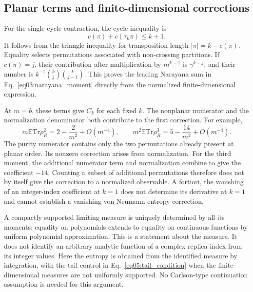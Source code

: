 \documentclass[11pt,letterpaper]{article}
\theoremstyle{plain}
\theoremstyle{definition}
\theoremstyle{remark}
\begin{document}
\subsection{Planar terms and finite-dimensional corrections}
\label{subsec12:result_free_poisson}
\label{subsec12:result_catalan_failure}

For the single-cycle contraction, the cycle inequality is
\begin{equation}
\label{eq12:cycle_bound}
 c(\pi)+c(\tau_k\pi)\leq k+1.
\end{equation}
It follows from the triangle inequality for transposition length
$|\pi|=k-c(\pi)$.  Equality selects permutations associated with
non-crossing partitions.  If $c(\pi)=j$, their contribution after
multiplication by $m^{k-1}$ is $\gamma^{k-j}$, and their number is
$k^{-1}\binom{k}{j}\binom{k}{j-1}$.  This proves the leading
Narayana sum in Eq.~\eqref{eq03:narayana_moment} directly from the
normalized finite-dimensional expression.

At $m=b$, these terms give $C_k$ for each fixed $k$.  The nonplanar
numerator and the normalization denominator both contribute to the
first correction.  For example,
\begin{equation}
\label{eq12:finite_corrections}
 m\mathbb E\mathrm{Tr}\rho_R^2
 =2-\frac{2}{m^2}+O(m^{-4}),
 \qquad
 m^2\mathbb E\mathrm{Tr}\rho_R^3
 =5-\frac{14}{m^2}+O(m^{-4}).
\end{equation}
The purity numerator contains only the two permutations already present
at planar order.  Its nonzero correction arises from normalization.
For the third moment, the additional numerator term and normalization
combine to give the coefficient $-14$.  Counting a subset of additional
permutations therefore does not by itself give the correction to a
normalized observable.  A fortiori, the vanishing of an integer-index
coefficient at $k=1$ does not determine its derivative at $k=1$ and
cannot establish a vanishing von Neumann entropy correction.

A compactly supported limiting measure is uniquely determined by all
its moments: equality on polynomials extends to equality on continuous
functions by uniform polynomial approximation.  This is a statement
about the measure.  It does not identify an arbitrary analytic function
of a complex replica index from its integer values.  Here the entropy
is obtained from the identified measure by integration, with the tail
control in Eq.~\eqref{eq05:tail_condition} when the finite-dimensional
measures are not uniformly supported.  No Carlson-type continuation
assumption is needed for this argument.
\end{document}
